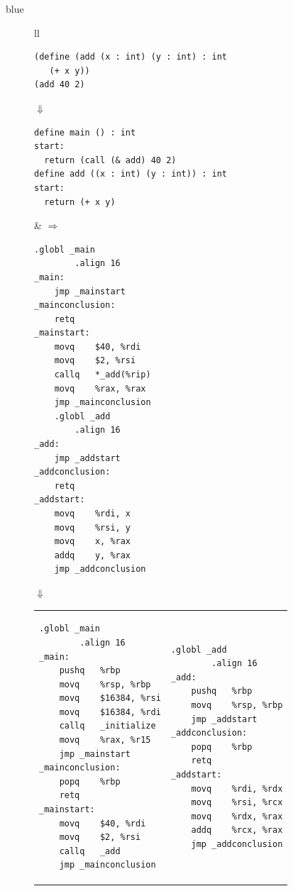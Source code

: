 \documentclass[11pt]{book}
\newcommand{\ocaml}[1]{{\color{blue}{#1}}}
\newenvironment{ocamlx}{
  \begin{color}{blue}
}
{
  \end{color}
}
\begin{document}
\begin{ocamlx}
\begin{figure}[htbp]
\begin{tabular}{ll}
\begin{minipage}{0.5\textwidth}
\begin{lstlisting}[basicstyle=\ttfamily\scriptsize,style=ocaml]
(define (add (x : int) (y : int) : int
   (+ x y))
(add 40 2)
\end{lstlisting}
$\Downarrow$
\begin{lstlisting}[basicstyle=\ttfamily\scriptsize,style=ocaml]
define main () : int 
start:
  return (call (& add) 40 2)
define add ((x : int) (y : int)) : int 
start:
  return (+ x y)
\end{lstlisting}
\end{minipage}
&
$\Rightarrow$
\begin{minipage}{0.5\textwidth}
\begin{lstlisting}[basicstyle=\ttfamily\scriptsize,style=ocaml]
	.globl _main
        .align 16  
_main:
	jmp	_mainstart
_mainconclusion:
	retq
_mainstart:
	movq	$40, %rdi
	movq	$2, %rsi
	callq	*_add(%rip)
	movq	%rax, %rax
	jmp	_mainconclusion
	.globl _add
        .align 16  
_add:
	jmp	_addstart
_addconclusion:
	retq
_addstart:
	movq	%rdi, x
	movq	%rsi, y
	movq	x, %rax
	addq	y, %rax
	jmp	_addconclusion
\end{lstlisting}
$\Downarrow$
\end{minipage}
\end{tabular}
\begin{tabular}{ll}
\begin{minipage}{0.4\textwidth}
\begin{lstlisting}[basicstyle=\ttfamily\scriptsize,style=ocaml]
	.globl _main
        .align 16  
_main:
	pushq	%rbp
	movq	%rsp, %rbp
	movq	$16384, %rsi
	movq	$16384, %rdi
	callq	_initialize
	movq	%rax, %r15
	jmp	_mainstart
_mainconclusion:
	popq	%rbp
	retq
_mainstart:
	movq	$40, %rdi
	movq	$2, %rsi
	callq	_add
	jmp	_mainconclusion
\end{lstlisting}
\end{minipage}
&
\begin{minipage}{0.5\textwidth}
\begin{lstlisting}[basicstyle=\ttfamily\scriptsize,style=ocaml]
	.globl _add
        .align 16  
_add:
	pushq	%rbp
	movq	%rsp, %rbp
	jmp	_addstart
_addconclusion:
	popq	%rbp
	retq
_addstart:
	movq	%rdi, %rdx
	movq	%rsi, %rcx
	movq	%rdx, %rax
	addq	%rcx, %rax
	jmp	_addconclusion
\end{lstlisting}
\end{minipage}
\end{tabular}
\caption{\ocaml{(OCaml) Example compilation of a simple function to x86.}}
\label{fig:add-fun-ocaml}
\end{figure}
\end{ocamlx}
\end{document}
